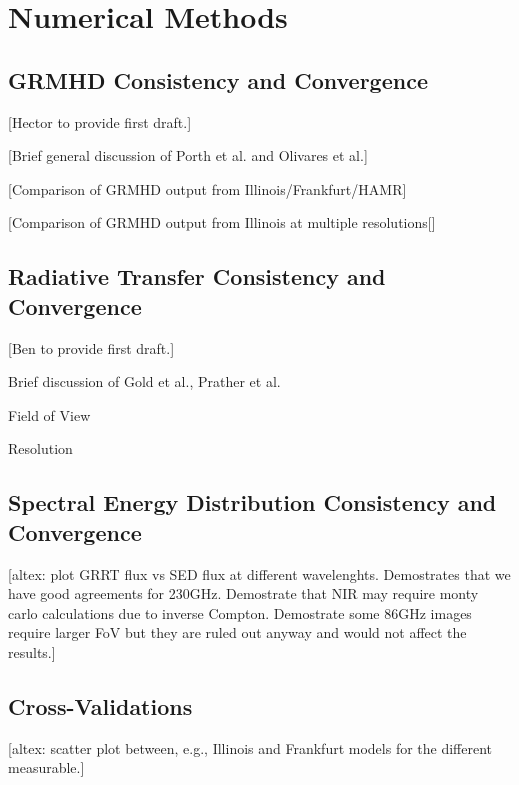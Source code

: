 \section{Numerical Methods}\label{app:numerical}

\subsection{GRMHD Consistency and Convergence}\label{app:resolution_study}

[Hector to provide first draft.]

[Brief general discussion of Porth et al. and Olivares et al.]

[Comparison of GRMHD output from Illinois/Frankfurt/HAMR]

[Comparison of GRMHD output from Illinois at multiple resolutions[]

\subsection{Radiative Transfer Consistency and Convergence}

[Ben to provide first draft.]

Brief discussion of Gold et al., Prather et al.

Field of View

Resolution

\subsection{Spectral Energy Distribution Consistency and Convergence}

\begin{figure*}
    \centering
    [altex: plot GRRT flux vs SED flux at different wavelenghts.  Demostrates that we have good agreements for 230GHz.  Demostrate that NIR may require monty carlo calculations due to inverse Compton.  Demostrate some 86GHz images require larger FoV but they are ruled out anyway and would not affect the results.]
    \caption{Comparing GRRT flux from monte carlo calculations.  The three columns are 86GHz, 230GHz, and NIR, respectively.  GRRT is only used to spot check x-ray and does not have a corresponding scatter plot.}
    \label{fig:sed_vv}
\end{figure*}

\subsection{Cross-Validations}

\begin{figure*}
    \centering
    [altex: scatter plot between, e.g., Illinois and Frankfurt models for the different measurable.]
    \caption{Comparing model predictions from different modeling pipelines.  ...}
    \label{fig:xv}
\end{figure*}